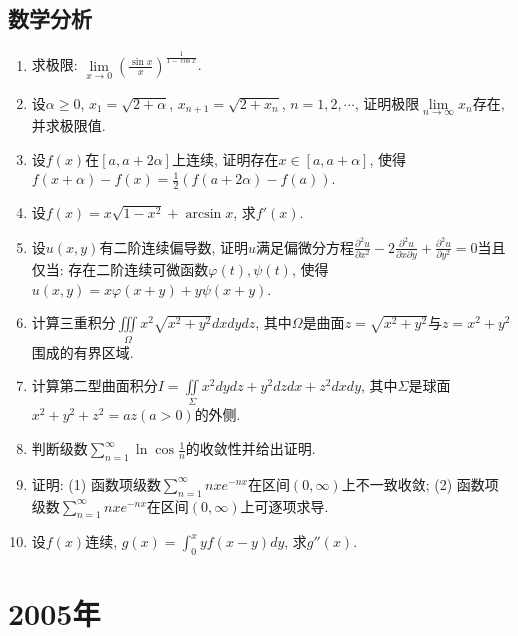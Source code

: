 \documentclass[12pt,a4paper,openany]{book}
\begin{document}
\subsection{数学分析}
\begin{enumerate}
\item 求极限: $\lim\limits_{x \rightarrow 0}{\displaystyle(\frac{\sin{x}}{x})^{\frac{1}{1 - \cos{x}}}}$.

\item 设$\alpha \ge 0$, $x_1 = \sqrt{2 + \alpha}$, $x_{n+1} = \sqrt{2 + x_n}$, $n = 1, 2, \cdots$, 证明极限$\lim\limits_{n \rightarrow \infty}{x_n}$存在, 并求极限值.

\item 设$f(x)$在$[a, a + 2\alpha]$上连续, 证明存在$x \in [a, a + \alpha]$, 使得$f(x + \alpha) - f(x) = \displaystyle\frac{1}{2}(f(a + 2\alpha) - f(a))$.

\item 设$f(x) = x\sqrt{1 - x^2} + \arcsin{x}$, 求$f'(x)$.

\item 设$u(x, y)$有二阶连续偏导数, 证明$u$满足偏微分方程$\displaystyle\frac{\partial^2u}{\partial{x^2}} - 2\frac{\partial^2u}{\partial{x}\partial{y}} + \frac{\partial^2u}{\partial{y^2}} = 0$当且仅当: 存在二阶连续可微函数$\varphi(t), \psi(t)$, 使得$u(x, y) = x\varphi(x+y) + y\psi(x + y)$.

\item 计算三重积分$\displaystyle\iiint\limits_{\varOmega}{x^2\sqrt{x^2 + y^2}dxdydz}$, 其中$\varOmega$是曲面$z = \sqrt{x^2 + y^2}$与$z = x^2 + y^2$围成的有界区域.

\item 计算第二型曲面积分$I = \displaystyle\iint\limits_{\varSigma}{x^2dydz + y^2dzdx + z^2dxdy}$, 其中$\varSigma$是球面$x^2 + y^2 + z^2 = az (a > 0)$的外侧.

\item 判断级数$\sum\limits_{n=1}^{\infty}{\displaystyle\ln\cos\frac{1}{n}}$的收敛性并给出证明.

\item 证明: (1) 函数项级数$\sum\limits_{n=1}^{\infty}{nxe^{-nx}}$在区间$(0, \infty)$上不一致收敛; (2) 函数项级数$\sum\limits_{n=1}^{\infty}{nxe^{-nx}}$在区间$(0, \infty)$上可逐项求导.

\item 设$f(x)$连续, $g(x) = \displaystyle\int_{0}^{x}{yf(x - y)dy}$, 求$g''(x)$.

\end{enumerate}

\section{2005年}
\end{document}
